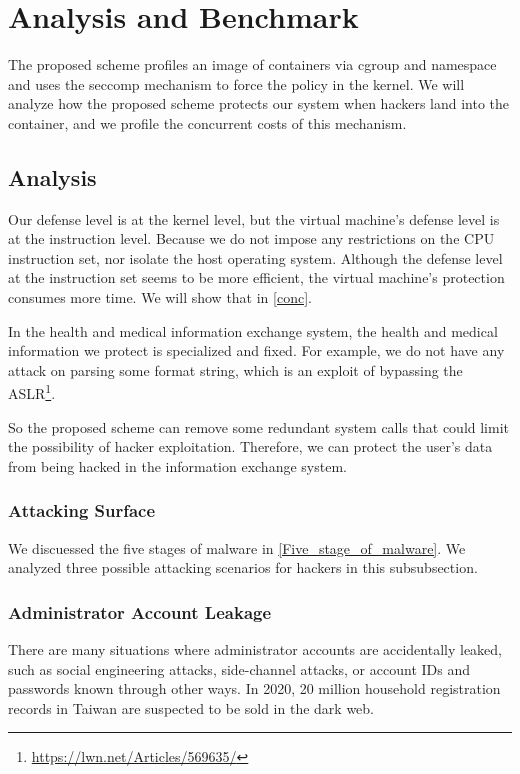 \section{Analysis and Benchmark}

The proposed scheme profiles an image of containers via cgroup and namespace
and uses the seccomp mechanism to force the policy in the kernel.
We will analyze how the proposed scheme protects our system when hackers land
into the container, and we profile the concurrent costs of this
mechanism.

\subsection{Analysis}
Our defense level is at the kernel level, but the virtual machine's
defense level is at the instruction level. Because we do not impose any
restrictions on the CPU instruction set, nor isolate the host operating system.
Although the defense level at the instruction set seems to be more efficient,
the virtual machine's protection consumes more time. We will show that in \ref{conc}.

In the health and medical information exchange system, the health and
medical information we protect is specialized and fixed. For example,
we do not have any attack on parsing some format string,
which is an exploit of bypassing the ASLR\footnote{\url{https://lwn.net/Articles/569635/}}.

So the proposed scheme can remove some redundant system calls that could
limit the possibility of hacker exploitation. Therefore, we can protect
the user's data from being hacked in the information exchange system.

\subsubsection{Attacking Surface}
We discuessed the five stages of malware in \ref{Five_stage_of_malware}. We analyzed
three possible attacking scenarios for hackers in this subsubsection.

\subsubsection{Administrator Account Leakage}
There are many situations where administrator accounts are accidentally
leaked, such as social engineering attacks, side-channel attacks,
or account IDs and passwords known through other ways.
In 2020, 20 million household registration records in Taiwan are
suspected to be sold in the dark web.%


